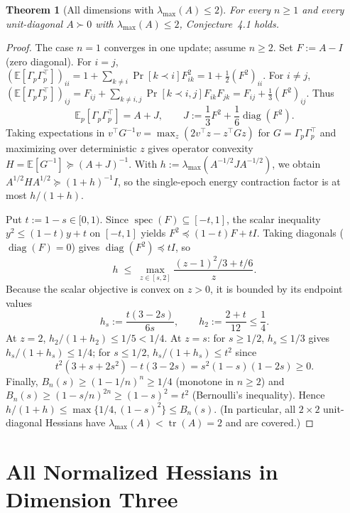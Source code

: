 \documentclass[11pt]{article}
\theoremstyle{plain}
\newtheorem{theorem}{Theorem}
\theoremstyle{definition}
\theoremstyle{remark}
\DeclareMathOperator{\diag}{diag}
\DeclareMathOperator{\tr}{tr}
\DeclareMathOperator{\spec}{spec}
\begin{document}
\begin{theorem}[All dimensions with $\lambda_{\max}(A) \le 2$]\label{thm:lam2}
For every $n \ge 1$ and every unit-diagonal $A \succ 0$ with $\lambda_{\max}(A) \le 2$, Conjecture~4.1 holds.
\end{theorem}

\begin{proof}
The case $n = 1$ converges in one update; assume $n \ge 2$.
Set $F := A - I$ (zero diagonal).
For $i = j$, $(\mathbb{E}[\Gamma_p \Gamma_p^\top])_{ii} = 1 + \sum_{k \neq i}\Pr[k \prec i]F_{ik}^2 = 1 + \frac{1}{2}(F^2)_{ii}$.
For $i \neq j$, $(\mathbb{E}[\Gamma_p \Gamma_p^\top])_{ij} = F_{ij} + \sum_{k \neq i, j}\Pr[k \prec i, j]F_{ik} F_{jk} = F_{ij} + \frac{1}{3}(F^2)_{ij}$.
Thus
\[
\mathbb{E}_p[\Gamma_p \Gamma_p^\top] = A + J, \qquad J := \frac{1}{3}F^2 + \frac{1}{6}\diag(F^2).
\]
Taking expectations in $v^\top G^{-1} v = \max_z (2v^\top z - z^\top G z)$ for $G = \Gamma_p \Gamma_p^\top$ and maximizing over deterministic $z$ gives operator convexity $H = \mathbb{E}[G^{-1}] \succeq (A + J)^{-1}$.
With $h := \lambda_{\max}(A^{-1/2} J A^{-1/2})$, we obtain $A^{1/2} H A^{1/2} \succeq (1 + h)^{-1} I$, so the single-epoch energy contraction factor is at most $h/(1 + h)$.

Put $t := 1 - s \in [0, 1)$.
Since $\spec(F) \subseteq [-t, 1]$, the scalar inequality $y^2 \le (1 - t)y + t$ on $[-t, 1]$ yields $F^2 \preceq (1 - t)F + t I$.
Taking diagonals ($\diag(F) = 0$) gives $\diag(F^2) \preceq t I$, so
\[
h \;\le\; \max_{z \in [s, 2]} \frac{(z - 1)^2/3 + t/6}{z}.
\]
Because the scalar objective is convex on $z > 0$, it is bounded by its endpoint values
\[
h_s := \frac{t(3 - 2s)}{6s}, \qquad h_2 := \frac{2 + t}{12} \le \frac{1}{4}.
\]
At $z = 2$, $h_2/(1 + h_2) \le 1/5 < 1/4$.
At $z = s$: for $s \ge 1/2$, $h_s \le 1/3$ gives $h_s/(1 + h_s) \le 1/4$; for $s \le 1/2$, $h_s/(1 + h_s) \le t^2$ since
\[
t^2(3 + s + 2s^2) - t(3 - 2s) = s^2(1 - s)(1 - 2s) \ge 0.
\]
Finally, $B_n(s) \ge (1 - 1/n)^n \ge 1/4$ (monotone in $n \ge 2$) and $B_n(s) \ge (1 - s/n)^{2n} \ge (1 - s)^2 = t^2$ (Bernoulli's inequality).
Hence $h/(1 + h) \le \max\{1/4, (1 - s)^2\} \le B_n(s)$.
(In particular, all $2 \times 2$ unit-diagonal Hessians have $\lambda_{\max}(A) < \tr(A) = 2$ and are covered.)
\end{proof}

\section{All Normalized Hessians in Dimension Three}
\end{document}
